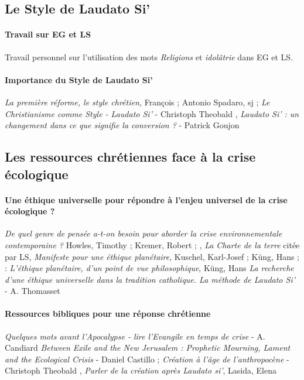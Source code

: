 \subsection{Le Style de Laudato Si'}

\paragraph{Travail sur EG et LS} Travail personnel sur l'utilisation des mots \textit{Religions} et \textit{idolâtrie} dans EG et LS. 

\paragraph{Importance du Style de Laudato Si’} \textit{La première réforme, le style chrétien,} François ; Antonio Spadaro, sj \cite{francois_premiere_2013}; \textit{Le Christianisme comme Style - Laudato Si'} - Christoph Theobald \cite{theobald_courage_2021}, \textit{Laudato Si’ : un changement dans ce que signifie la conversion ?} - Patrick Goujon \cite{goujon_laudato_2022}

\subsection{Les ressources chrétiennes face à la crise écologique}



\paragraph{Une éthique universelle pour répondre à l'enjeu universel de la crise écologique ?} \textit{De quel genre de pensée a-t-on besoin pour aborder la crise environnementale contemporaine ?} Howles, Timothy ; Kremer, Robert \cite{howles_quel_2022};  \cite{thomasset_recherche_2019}, \textit{La Charte de la terre} citée par LS, \textit{Manifeste pour une éthique planétaire}, Kuschel, Karl-Josef ; Küng, Hans ; \cite{kuschel_manifeste_1995} : \textit{L’éthique planétaire, d’un point de vue philosophique}, Küng, Hans \cite{kung_lethique_2009} \textit{La recherche d’une éthique universelle dans la tradition catholique. La méthode de Laudato Si’ }- A. Thomasset 

\paragraph{Ressources bibliques pour une réponse chrétienne}
\textit{Quelques mots avant l’Apocalypse - lire l’Evangile en temps de crise} - A. Candiard \cite{candiard_quelques_2022}
\textit{Between Exile and the New Jerusalem : Prophetic Mourning, Lament and the Ecological Crisis} - Daniel Castillo \cite{cavanaugh_between_2018}; \textit{Création à l’âge de l’anthropocène} - Christoph Theobald \cite{theobald_repenser_2019},  \textit{Parler de la création après Laudato si’}, Lasida, Elena \cite{lasida_parler_2020}

